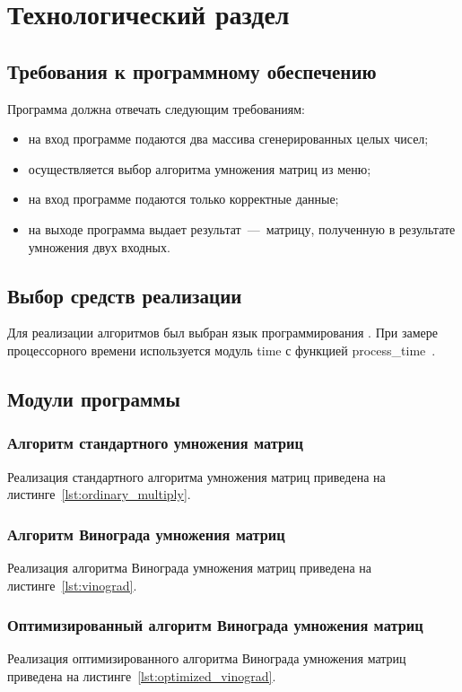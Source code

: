 \chapter{Технологический раздел}
\section{Требования к программному обеспечению}
Программа должна отвечать следующим требованиям:
\begin{itemize}
	\item на вход программе подаются два массива сгенерированных целых чисел;
	\item осуществляется выбор алгоритма умножения матриц из меню;
	\item на вход программе подаются только корректные данные;
	\item на выходе программа выдает результат~---~матрицу, полученную в результате умножения двух входных.
\end{itemize}

\section{Выбор средств реализации}
Для реализации алгоритмов был выбран язык программирования . При замере процессорного времени используется модуль time с функцией process\_time~\cite{process_time}.

\section{Модули программы}
\subsection{Алгоритм стандартного умножения матриц}
Реализация стандартного алгоритма умножения матриц приведена на листинге~\ref{lst:ordinary_multiply}.

\subsection{Алгоритм Винограда умножения матриц}
Реализация алгоритма Винограда умножения матриц приведена на листинге~\ref{lst:vinograd}.

\subsection{Оптимизированный алгоритм Винограда умножения матриц}
Реализация оптимизированного алгоритма Винограда умножения матриц приведена на листинге~\ref{lst:optimized_vinograd}.
\newpage

\newpage
